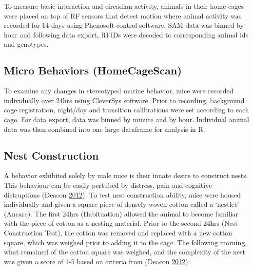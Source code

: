 \documentclass[onehalf,12pt]{beavtex}
\begin{document}
  To measure basic interaction and circadian activity, animals in their
  home cages were placed on top of RF sensors that detect motion where
  animal activity was recorded for 14 days using Phenosoft control
  software. SAM data was binned by hour and following data export, RFIDs
  were decoded to corresponding animal ids and genotypes.
  
  \subsection{Micro Behaviors
  (HomeCageScan)}\label{micro-behaviors-homecagescan}
  
  To examine any changes in stereotyped murine behavior, mice were
  recorded individually over 24hrs using CleverSys software. Prior to
  recording, background cage registration, night/day and transition
  calibrations were set according to each cage. For data export, data was
  binned by minute and by hour. Individual animal data was then combined
  into one large dataframe for analysis in R.
  
  \subsection{Nest Construction}\label{nestcomethod}
  
  A behavior exhibited solely by male mice is their innate desire to
  construct nests. This behaviour can be easily pertubed by distress, pain
  and cognitive distruptions (Deacon
  \protect\hyperlink{ref-DeaconAssessingBurrowingNest2012}{2012}). To test
  nest construction ability, mice were housed individually and given a
  square piece of densely woven cotton called a `nestlet' (Ancare). The
  first 24hrs (Habituation) allowed the animal to become familiar with the
  piece of cotton as a nesting material. Prior to the second 24hrs (Nest
  Construction Test), the cotton was removed and replaced with a new
  cotton square, which was weighed prior to adding it to the cage. The
  following morning, what remained of the cotton square was weighed, and
  the complexity of the nest was given a score of 1-5 based on criteria
  from (Deacon
  \protect\hyperlink{ref-DeaconAssessingBurrowingNest2012}{2012}):
  
\end{document}
